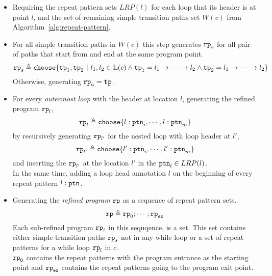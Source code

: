 \begin{itemize}
\item Requiring the repeat pattern sets $LRP(l)$ for each loop
that its header is at point $l$,
and the set of remaining simple transition paths set $W(c)$ from Algorithm~\ref{alg:repeat-pattern}.
% 
\item For all simple transition paths in $W(c)$
this step generates $\mathtt{rp}_{s}$ for all pair of
paths that start from and end at the same program point.
\[
  \rprog_{s} \triangleq 
  \rpchoose{
  \tpath_1, \tpath_2 ~|~ l_1, l_2 \in \lvar(c) \land 
  \tpath_1 = l_1 \to \cdots \to l_2 \land \tpath_2 = l_1 \to \cdots \to l_2
  }
\]
Otherwise, generating $\mathtt{rp}_{a} = \mathtt{tp}$.
%
\item 
For every \emph{outermost loop} with the header at location $l$, 
generating the refined program $\mathtt{rp}_l$,
\[
  \rprog_l \triangleq 
  \rpchoose{
   l: \rpattern_{i}, \cdots, l: \rpattern_{m}
  }
\]
by 
recursively generating $\mathtt{rp}_{l'}$ for the nested loop with loop header at $l'$,
\[
  \rprog_{l'} \triangleq 
\rpchoose{
 l': \rpattern_{i}, \cdots, l': \rpattern_{m}
}
\]
and inserting the $\mathtt{rp}_{l'}$ at the location $l'$ in the $\mathtt{ptn}_l \in LRP(l)$.
\\
In the same time, adding a loop head annotation $l$ on the beginning of every repeat pattern $l: \mathtt{ptn}$.
\item
Generating the \emph{refined program} $\mathtt{rp}$ as a sequence of repeat pattern sets.
%
\[
\mathtt{rp} \triangleq \mathtt{rp}_0; \cdots; \mathtt{rp}_{\mathtt{ex}}
\]
%
Each sub-refined program $\mathtt{rp}_i$ in this sequqence,
is a set. This set contains either
simple transition paths $\mathtt{rp}_{s}$ not in any while loop
or a set of repeat patterns for a while loop $\mathtt{rp}_l$ in $c$.
\\
$\mathtt{rp}_0$ contains the repeat patterns with the program entrance as the starting point
and $\mathtt{rp}_{\mathtt{ex}}$ contains the repeat patterns going to the program exit point.
%
\end{itemize}
%

